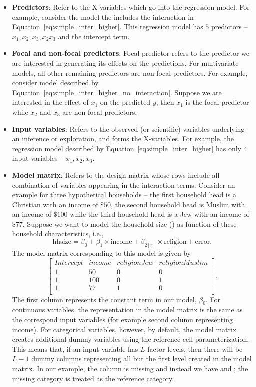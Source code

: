 \begin{itemize}
\item \textbf{Predictors}: Refer to the X-variables which go into the regression model. For example, consider the model the includes the interaction in Equation~\ref{eq:simple_inter_higher}. This regression model has $5$ predictors -- $x_1, x_2, x_3, x_2x_3$ and the intercept term.
\item \textbf{Focal and non-focal predictors}: Focal predictor refers to the predictor we are interested in generating its effects on the predictions. For multivariate models, all other remaining predictors are non-focal predictors. For example, consider model described by Equation~\ref{eq:simple_inter_higher_no_interaction}. Suppose we are interested in the effect of $x_1$ on the predicted $y$, then $x_1$ is the focal predictor while $x_2$ and $x_3$ are non-focal predictors.
\item \textbf{Input variables}: Refers to the observed (or scientific) variables underlying an inference or exploration, and forms the X-variables. For example, the regression model described by Equation~\ref{eq:simple_inter_higher} has only $4$ input variables -- $x_1, x_2, x_3$.
\item \textbf{Model matrix}: Refers to the design matrix whose rows include all combination of variables appearing in the interaction terms. Consider an example for three hypothetical households -- the first household head is a Christian with an income of $\$ 50$, the second household head is Muslim with an income of $\$ 100$ while the third household head is a Jew with an income of $\$ 77$. Suppose we want to model the household size () as function of these household characteristics, i.e., $$\mathrm{hhsize} = \beta_0 + \beta_1\times\mathrm{income} + \beta_{2[r]}\times\mathrm{religion} + \mathrm{error}.$$ The model matrix corresponding to this model is given by
$$\begin{bmatrix}{}
 Intercept & income & religionJew & religionMuslim \\
 1 & 50 & 0 & 0 \\
  1 & 100 & 0 & 1 \\
  1 & 77 & 1 & 0 \\
\end{bmatrix}.$$ The first column represents the constant term in our model, $\beta_0$. For continuous variables, the representation in the model matrix is the same as the correspond input variables (for example second column representing income). For categorical variables, however, by default, the model matrix  creates additional dummy variables using the reference cell parameterization. This means that, if an input variable has $L$ factor levels, then there will be $L-1$ dummy columns representing all but the first level created in the model matrix. In our example, the column  is missing and instead we have  and ; the missing category  is treated as the reference category.

\end{itemize}
